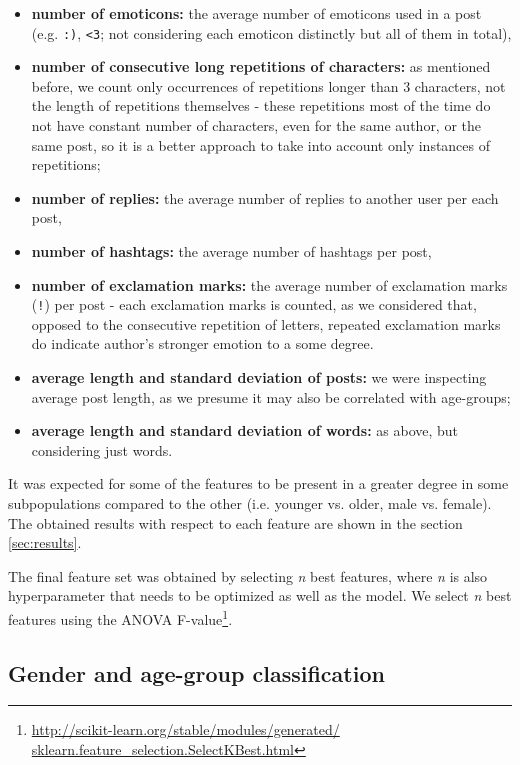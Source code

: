 \documentclass[10pt, a4paper]{article}
\begin{document}
\begin{itemize}
	\item \textbf{number of emoticons:} the average number of emoticons used in a post (e.g. \verb|:)|, \verb|<3|; not considering each emoticon distinctly but all of them in total),
	\item \textbf{number of consecutive long repetitions of characters:} as mentioned before, we count only occurrences of repetitions longer than 3 characters, not the length of repetitions themselves - these repetitions most of the time do not have constant number of characters, even for the same author, or the same post, so it is a better approach to take into account only instances of repetitions;
	\item \textbf{number of replies:} the average number of replies to another user per each post,
	\item \textbf{number of hashtags:} the average number of hashtags per post,
	\item \textbf{number of exclamation marks:} the average number of exclamation marks (\verb|!|) per post - each exclamation marks is counted, as we considered that, opposed to the consecutive repetition of letters, repeated exclamation marks do indicate author's stronger emotion to a some degree.
	\item \textbf{average length and standard deviation of posts:} we were inspecting average post length, as we presume it may also be correlated with age-groups;
	\item \textbf{average length and standard deviation of words:} as above, but considering just words.
\end{itemize}

It was expected for some of the features to be present in a greater degree in some subpopulations compared to the other (i.e. younger vs. older, male vs. female).
The obtained results with respect to each feature are shown in the section \ref{sec:results}.

The final feature set was obtained by selecting \textit{n} best features, where \textit{n} is also hyperparameter that needs to be optimized as well as the model.
We select \textit{n} best features using the ANOVA F-value\footnote{\url{http://scikit-learn.org/stable/modules/generated/
	sklearn.feature\_selection.SelectKBest.html}}.

\subsection{Gender and age-group classification}
\end{document}
